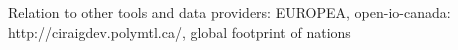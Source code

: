 Relation to other tools and data providers: EUROPEA, open-io-canada: http://ciraigdev.polymtl.ca/, global footprint of nations